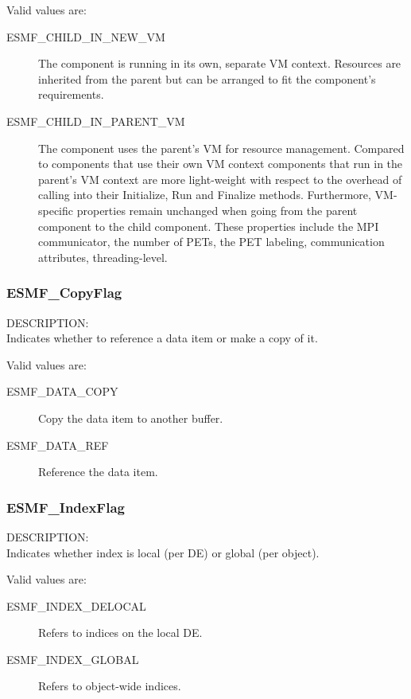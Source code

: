 Valid values are:
\begin{description}

\item [ESMF\_CHILD\_IN\_NEW\_VM]
         The component is running in its own, separate VM context. Resources
         are inherited from the parent but can be arranged to fit the
         component's requirements.
\item [ESMF\_CHILD\_IN\_PARENT\_VM]
         The component uses the parent's VM for resource management. Compared
         to components that use their own VM context components that run in the
         parent's VM context are more light-weight with respect to the overhead
         of calling into their Initialize, Run and Finalize methods.
         Furthermore, VM-specific properties remain unchanged when going from
         the parent component to the child component. These properties include
         the MPI communicator, the number of PETs, the PET labeling, 
         communication attributes, threading-level.

\end{description}

\subsubsection{ESMF\_CopyFlag}
\label{opt:copyflag}
{\sf DESCRIPTION:\\}
Indicates whether to reference a data item or make a copy of it.

Valid values are:
\begin{description}
\item [ESMF\_DATA\_COPY]
      Copy the data item to another buffer.
\item [ESMF\_DATA\_REF]
      Reference the data item.
\end{description}

\subsubsection{ESMF\_IndexFlag}
\label{opt:indexflag}
{\sf DESCRIPTION:\\}
Indicates whether index is local (per DE) or global (per object).

Valid values are:
\begin{description}
\item [ESMF\_INDEX\_DELOCAL]
      Refers to indices on the local DE.
\item [ESMF\_INDEX\_GLOBAL]
      Refers to object-wide indices.
\end{description}

